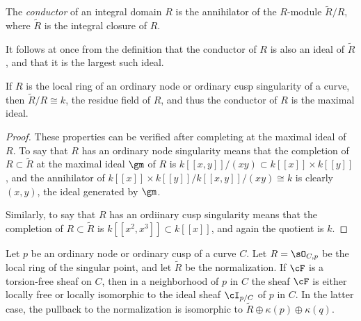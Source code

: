 \begin{definition}
The \emph{conductor} of an integral domain $R$ is the annihilator of the $R$-module
$\widetilde R/R$, where $\widetilde R$ is the integral closure of $R$.
\end{definition}

It follows at once from the definition that the conductor of $R$ is also an ideal of $\widetilde R$, and that it is the largest such ideal.

\begin{proposition}
If $R$ is the local ring of an ordinary node or ordinary cusp singularity of a curve, then  $\widetilde R/R \cong k$, the residue field of $R$, and thus the conductor of $R$ is the
maximal ideal. 
\end{proposition}

\begin{proof} These properties can be verified after completing at the maximal ideal of $R$.
To say that $R$ has an ordinary node singularity means that the completion of $R \subset \widetilde R$ at the maximal ideal $\gm$ of $R$ is $k[[x,y]]/(xy)\subset k[[x]]\times k[[y]]$, and 
the annihilator of $k[[x]]\times k[[y]]/k[[x,y]]/(xy) \cong k$ is clearly $(x,y)$, the ideal generated by $\gm$.

Similarly, to say that $R$ has an ordiinary cusp singularity means that the completion of 
$R \subset \widetilde R$ is $k[[x^2,x^3]]\subset k[[x]]$, and again the quotient is $k$.
\end{proof}

\begin{lemma}\label{torsion free at node}
Let $p$ be an ordinary node or ordinary cusp of a curve $C$. Let $R = \sO_{C,p}$ be the local ring of the singular point,
and let $\tilde R$ be the normalization.  If $\cF$ is a torsion-free sheaf on $C$, then in a neighborhood of $p$ in $C$ the sheaf $\cF$ is either locally free or locally isomorphic to the ideal sheaf $\cI_{p/C}$ of $p$ in $C$.
In the latter case, the pullback to the normalization is isomorphic to $\tilde R\oplus \kappa(p) \oplus \kappa(q)$.
\end{lemma}

